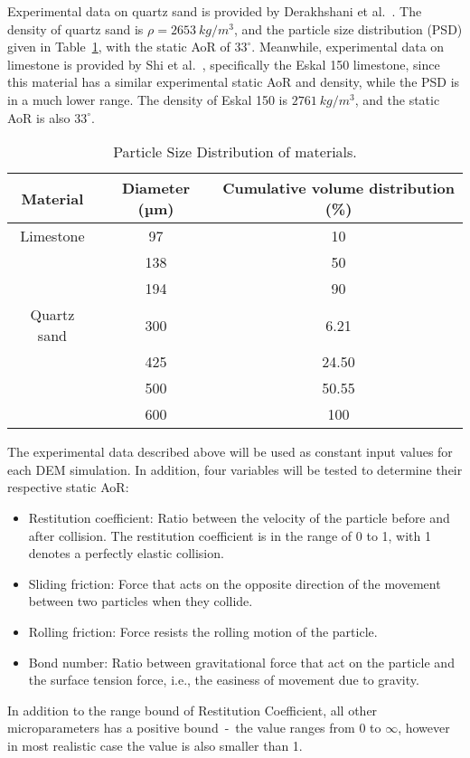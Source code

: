 Experimental data on quartz sand is provided by Derakhshani et al.~\cite{DERAKHSHANI2015127}. The density of quartz sand is $\rho = 2653~kg/m^3$, and the particle size distribution (PSD) given in Table~\ref{table:psd}, with the static AoR of $33^{\circ}$. Meanwhile, experimental data on limestone is provided by Shi et al.~\cite{SHI2020183}, specifically the Eskal 150 limestone, since this material has a similar experimental static AoR and density, while the PSD is in a much lower range. The density of Eskal 150 is $2761~kg/m^3$, and the static AoR is also $33^{\circ}$.


\begin{table}[H]
    \centering
    \begin{tabular}{c|cc}
    Material & Diameter (µm) & Cumulative volume distribution (\%) \\ \hline
    Limestone & 97 & 10 \\
     & 138 & 50 \\
     & 194 & 90 \\ \hline
    Quartz sand & 300 & 6.21 \\
     & 425 & 24.50 \\
     & 500 & 50.55 \\
     & 600 & 100
    \end{tabular}
    \caption{Particle Size Distribution of materials.}\label{table:psd}
\end{table}
        

The experimental data described above will be used as constant input values for each DEM simulation. In addition, four variables will be tested to determine their respective static AoR:\@
\begin{itemize}
    \item Restitution coefficient: Ratio between the velocity of the particle before and after collision. The restitution coefficient is in the range of 0 to 1, with 1 denotes a perfectly elastic collision.
    \item Sliding friction: Force that acts on the opposite direction of the movement between two particles when they collide. 
    \item Rolling friction: Force resists the rolling motion of the particle. 
    \item Bond number: Ratio between gravitational force that act on the particle and the surface tension force, i.e., the easiness of movement due to gravity. 
\end{itemize}

In addition to the range bound of Restitution Coefficient, all other microparameters has a positive bound~-~the value ranges from 0 to $\infty$, however in most realistic case the value is also smaller than 1.



